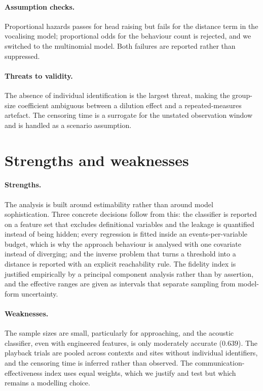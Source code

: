 \documentclass{apmcmthesis}
\begin{document}
\paragraph{Assumption checks.} Proportional hazards passes for head raising but fails for
the distance term in the vocalising model; proportional odds for the behaviour count is
rejected, and we switched to the multinomial model. Both failures are reported rather than
suppressed.

\paragraph{Threats to validity.} The absence of individual identification is the largest
threat, making the group-size coefficient ambiguous between a dilution effect and a
repeated-measures artefact. The censoring time is a surrogate for the unstated observation
window and is handled as a scenario assumption.

\section{Strengths and weaknesses}

\paragraph{Strengths.} The analysis is built around estimability rather than around model
sophistication. Three concrete decisions follow from this: the classifier is reported on a
feature set that excludes definitional variables and the leakage is quantified instead of
being hidden; every regression is fitted inside an events-per-variable budget, which is
why the approach behaviour is analysed with one covariate instead of diverging; and the
inverse problem that turns a threshold into a distance is reported with an explicit
reachability rule. The fidelity index is justified empirically by a principal component
analysis rather than by assertion, and the effective ranges are given as intervals that
separate sampling from model-form uncertainty.

\paragraph{Weaknesses.} The sample sizes are small, particularly for approaching, and the
acoustic classifier, even with engineered features, is only moderately accurate
($0.639$). The playback trials are pooled across contexts and sites without individual
identifiers, and the censoring time is inferred rather than observed. The
communication-effectiveness index uses equal weights, which we justify and test but which
remains a modelling choice.
\end{document}
